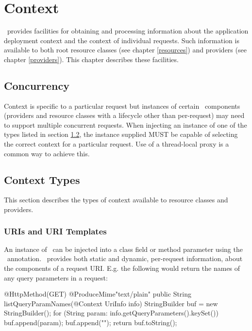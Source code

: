 \chapter{Context}
\label{context}

\jaxrs\ provides facilities for obtaining and processing information about the application deployment context and the context of individual requests. Such information is available to both root resource classes (see chapter \ref{resources}) and providers (see chapter \ref{providers}). This chapter describes these facilities.

\section{Concurrency}

Context is specific to a particular request but instances of certain \jaxrs\ components (providers and resource classes with a lifecycle other than per-request) may need to support multiple concurrent requests. When injecting an instance of one of the types listed in section \ref{contexttypes}, the instance supplied MUST be capable of selecting the correct context for a particular request. Use of a thread-local proxy is a common way to achieve this.

\section{Context Types}
\label{contexttypes}

This section describes the types of context available to resource classes and providers.

\subsection{URIs and URI Templates}

An instance of \UriInfo\ can be injected into a class field or method parameter using the \Context\ annotation. \UriInfo\ provides both static and dynamic, per-request information, about the components of a request URI. E.g. the following would return the names of any query parameters in a request:

\begin{listing}{1}
@HttpMethod(GET)
@ProduceMime{"text/plain"}
public String listQueryParamNames(@Context UriInfo info) {
  StringBuilder buf = new StringBuilder();
  for (String param: info.getQueryParameters().keySet()) {
    buf.append(param);
    buf.append("\n");
  }
  return buf.toString();
}
\end{listing} 

